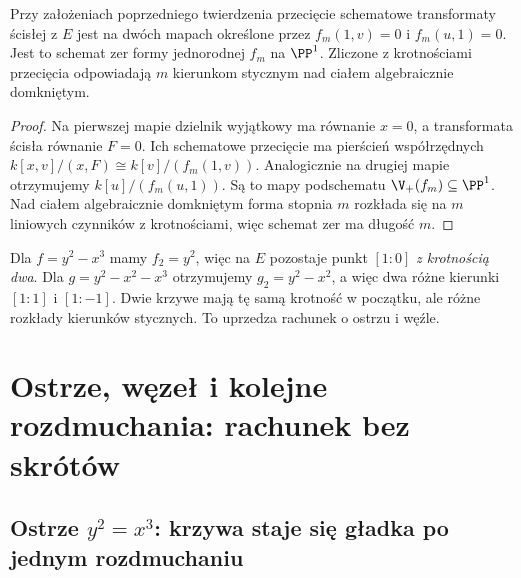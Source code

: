 \begin{wniosek}
\label{wn:ga5-tangent-directions}
Przy założeniach poprzedniego twierdzenia
przecięcie schematowe transformaty ścisłej z $E$
jest na dwóch mapach określone przez
$f_m(1,v)=0$ i $f_m(u,1)=0$. Jest to schemat zer
formy jednorodnej $f_m$ na $\PP^1$.
Zliczone z krotnościami przecięcia odpowiadają
$m$ kierunkom stycznym nad ciałem algebraicznie
domkniętym.
\end{wniosek}
\begin{proof}
Na pierwszej mapie dzielnik wyjątkowy ma równanie
$x=0$, a transformata ścisła równanie $F=0$.
Ich schematowe przecięcie ma pierścień współrzędnych
$k[x,v]/(x,F)\cong k[v]/(f_m(1,v))$.
Analogicznie na drugiej mapie otrzymujemy
$k[u]/(f_m(u,1))$. Są to mapy podschematu
$\V_+(f_m)\subseteq\PP^1$. Nad ciałem algebraicznie
domkniętym forma stopnia $m$ rozkłada się na
$m$ liniowych czynników z krotnościami, więc
schemat zer ma długość $m$.
\end{proof}

\begin{przyklad}
Dla $f=y^2-x^3$ mamy $f_2=y^2$, więc na $E$
pozostaje punkt $[1:0]$ \emph{z krotnością dwa}.
Dla $g=y^2-x^2-x^3$ otrzymujemy
$g_2=y^2-x^2$, a więc dwa różne kierunki
$[1:1]$ i $[1:-1]$. Dwie krzywe mają tę samą
krotność w początku, ale różne rozkłady kierunków
stycznych. To uprzedza rachunek o ostrzu i węźle.
\end{przyklad}

\section{Ostrze, węzeł i kolejne rozdmuchania: rachunek bez skrótów}
\label{sec:ga5-cusp-node}

\subsection[Ostrze: wygładzenie po jednym rozdmuchaniu]{Ostrze $y^2=x^3$: krzywa staje się gładka po jednym rozdmuchaniu}

